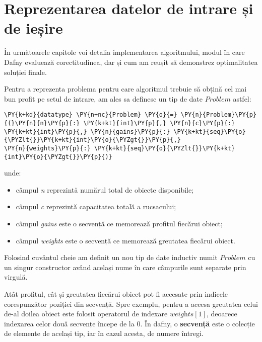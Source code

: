 \lstset{style=mylststyle}
\begin{sloppypar}

\chapter{Reprezentarea datelor de intrare și de ieșire}

În următoarele capitole voi detalia implementarea algoritmului, modul în care Dafny evaluează corectitudinea, dar și cum am reușit să demonstrez optimalitatea soluției finale. \par 
Pentru a reprezenta problema pentru care algoritmul trebuie să obțină cel mai bun profit pe setul de intrare, am ales sa definesc un tip de date $\textit{Problem}$ astfel:

\begin{Verbatim}[commandchars=\\\{\}]
\PY{k+kd}{datatype} \PY{n+nc}{Problem} \PY{o}{=} \PY{n}{Problem}\PY{p}{(}\PY{n}{n}\PY{p}{:} \PY{k+kt}{int}\PY{p}{,} \PY{n}{c}\PY{p}{:} \PY{k+kt}{int}\PY{p}{,} \PY{n}{gains}\PY{p}{:} \PY{k+kt}{seq}\PY{o}{\PYZlt{}}\PY{k+kt}{int}\PY{o}{\PYZgt{}}\PY{p}{,} 
\PY{n}{weights}\PY{p}{:} \PY{k+kt}{seq}\PY{o}{\PYZlt{}}\PY{k+kt}{int}\PY{o}{\PYZgt{}}\PY{p}{)} 
\end{Verbatim}
unde:
\begin{itemize}
    \item câmpul \textit{n} reprezintă numărul total de obiecte disponibile;
    \item câmpul \textit{c} reprezintă capacitatea totală a rucsacului;
    \item câmpul \textit{gains} este o secvență ce memorează profitul fiecărui obiect;
    \item câmpul \textit{weights} este o secvență ce memorează greutatea fiecărui obiect.
\end{itemize} \par
Folosind cuvântul cheie  am definit un nou tip de date inductiv numit $\textit{Problem}$ cu un singur constructor având același nume în care câmpurile sunt separate prin virgulă.
\par
Atât profitul, cât și greutatea fiecărui obiect pot fi accesate prin indicele corespunzător poziției din secvență. Spre exemplu, pentru a accesa greutatea celui de-al doilea obiect este folosit operatorul de indexare $\textit{weights}[1]$, deoarece indexarea celor două secvențe începe de la 0. În dafny, o \textbf{secvență} este o colecție de elemente de același tip, iar în cazul acesta, de numere întregi.  \par

\end{sloppypar}
